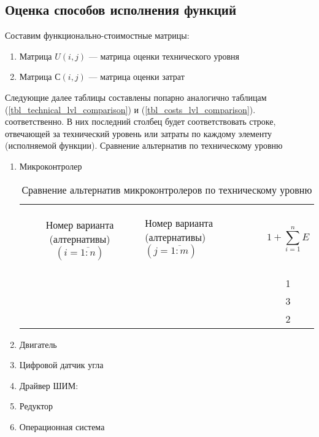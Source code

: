 \subsection{Оценка способов исполнения функций}
Составим функционально-стоимостные матрицы:
\begin{enumerate}
    \item Матрица $U(i,j)$ --- матрица оценки технического уровня
    \item Матрица $С(i,j)$ --- матрица оценки затрат
\end{enumerate}

Следующие далее таблицы составлены попарно аналогично таблицам
(\ref{tbl_technical_lvl_comparison}) и (\ref{tbl_costs_lvl_comparison}).
соответственно. В них последний столбец будет соответствовать строке, отвечающей
за технический уровень или затраты по каждому элементу (исполняемой функции).
Сравнение альтернатив по техническому уровню

\begin{enumerate}
    \item Микроконтролер
    \begin{table}[h!]
        \centering
        \begin{tabular}{|c|p{2cm}|p{2cm}|p{2cm}|c|}
            \hline
            \multirow{2}{2.4cm}{
                \centering
                Номер варианта (алтернативы) $(i = \overline{1:n})$
            } &
            \multicolumn{3}{p{6cm}|}{
                \begin{center}
                    Номер варианта (алтернативы) $(j = \overline{1:m})$
                \end{center}
            } &
            \multirow{2}{2cm}{
                $$1 + \sum_{i=1}^n E$$
            } \\
            & \centering{ 1 } & \centering{ 2 } & \centering{ 3 } & \\
            \hline
            \centering{1} & \centering{---} & \centering{ 1 } & \centering{ 1 } & 1 \\ \hline
            \centering{2} & \centering{ 0 } & \centering{---} & \centering{ 1 } & 3 \\ \hline
            \centering{3} & \centering{ 0 } & \centering{ 0 } & \centering{---} & 2 \\ \hline
        \end{tabular}
        \caption{Сравнение альтернатив микроконтролеров по техническому уровню}
        \label{tbl_mcu_tech_lvl_comparison}
    \end{table}

    \item Двигатель

    \item Цифровой датчик угла

    \item Драйвер ШИМ:

    \item Редуктор

    \item Операционная система

\end{enumerate}
